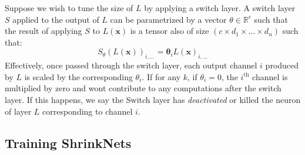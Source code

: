 Suppose we wish to tune the size of $L$ by applying a switch layer.
A switch layer $S$ applied to the output of $L$ can be parametrized by a 
vector $\theta \in \mathbb{R}^c$ such that the result of applying $S$ to $L(\bm{x})$
is a tensor also of size $\left(c \times d_1 \times \dots \times d_n\right)$
such that: 
\begin{equation} 
S_{\theta}(L(\bm{x}))_{i,...} = \bm{\theta}_iL(\bm{x})_{i, ...}
\end{equation}
Effectively, once passed through the switch layer, each output channel $i$ 
produced by $L$ is scaled by the corresponding $\theta_i$.
If for any $k$, if $\theta_i = 0$, the $i^{\text{th}}$ channel is multiplied by 
zero and wont contribute to any computations after the switch layer.
If this happens, we say the Switch layer has {\it deactivated} or killed the 
neuron of layer $L$ corresponding to channel $i$. 



\subsection{Training ShrinkNets} 

